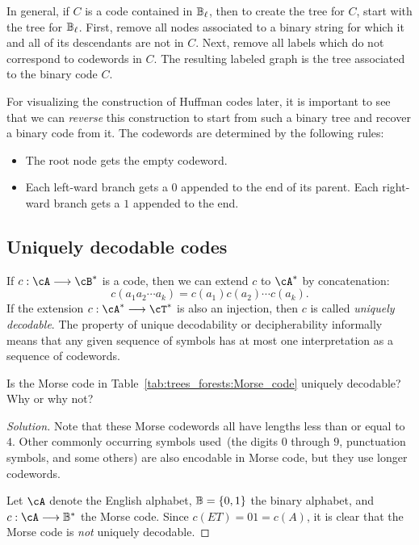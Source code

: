 In general, if $C$ is a code contained in $\mathbb{B}_\ell$, then to create
the tree for $C$, start with the tree
for $\mathbb{B}_\ell$. First, remove all nodes associated to a binary string
for which it and all of its descendants are not in $C$. Next, remove
all labels which do not correspond to codewords in $C$. The resulting
labeled graph is the tree associated to the binary code $C$.

For visualizing the construction of Huffman codes
later, it is important to see that we can \emph{reverse} this
construction to start from such a binary tree and
recover a binary code from it. The codewords are
determined by the following rules:
\begin{itemize}
\item The root node gets the empty codeword.

\item Each left-ward branch gets a $0$ appended to the end of its
  parent. Each right-ward branch gets a $1$ appended to the end.
\end{itemize}



\subsection{Uniquely decodable codes}

If $c: \cA \to \cB^*$ is a code, then we can extend $c$ to $\cA^*$ by
concatenation:
\[
c(a_1 a_2 \cdots a_k)
=
c(a_1) c(a_2) \cdots c(a_k).
\]
If the extension $c: \cA^* \to \cT^*$ is also an injection, then $c$
is called \emph{uniquely decodable}.
The property of unique decodability or decipherability informally
means that any given sequence of symbols has at most one
interpretation as a sequence of codewords.

\begin{example}
Is the Morse code in
Table~\ref{tab:trees_forests:Morse_code} uniquely decodable? Why or
why not?
\end{example}

\begin{proof}[Solution]
Note that these Morse codewords all have lengths less than or equal to
$4$. Other commonly occurring symbols used~(the digits $0$ through
$9$, punctuation symbols, and some others) are also encodable in Morse
code, but they use longer codewords.

Let $\cA$ denote the English alphabet, $\mathbb{B} = \{0, 1\}$ the
binary alphabet, and $c: \cA \to \B^*$ the
Morse code. Since $c(ET) = 01 = c(A)$, it is clear
that the Morse code is \emph{not} uniquely decodable.
\end{proof}

